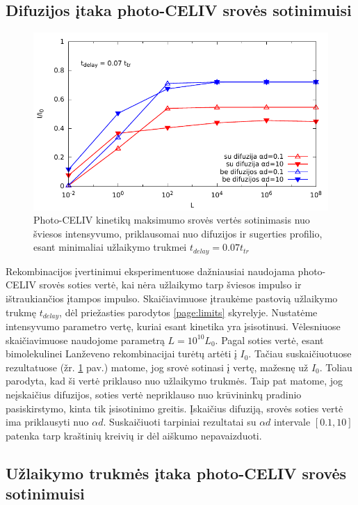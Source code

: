 \subsection{Difuzijos įtaka photo-CELIV srovės sotinimuisi}
\label{page:saturation}
\begin{figure}[H]
  \centering
    \includegraphics{./media/pdf/semilogsaturation.pdf}
  \caption{Photo-CELIV kinetikų maksimumo srovės vertės sotinimasis nuo šviesos intensyvumo, priklausomai nuo difuzijos ir sugerties profilio, esant minimaliai užlaikymo trukmei $t_{delay} = 0.07t_{tr}$}
  \label{fig:saturation}
\end{figure}

Rekombinacijos įvertinimui eksperimentuose dažniausiai naudojama photo-CELIV srovės soties vertė, kai nėra užlaikymo tarp šviesos impulso ir ištraukiančios įtampos impulso. Skaičiavimuose įtraukėme pastovią užlaikymo trukmę $t_{delay}$, dėl priežasties parodytos \ref{page:limits} skyrelyje. Nustatėme intensyvumo parametro vertę, kuriai esant kinetika yra įsisotinusi. Vėlesniuose skaičiavimuose naudojome parametrą $L=10^{10} L_0$. Pagal \cite{juška:155202} soties vertė, esant bimolekulinei Lanževeno rekombinacijai turėtų artėti į $I_0$. Tačiau suskaičiuotuose rezultatuose (žr. \ref{fig:saturation} pav.) matome, jog srovė sotinasi į vertę, mažesnę už $I_0$. Toliau parodyta, kad ši vertė priklauso nuo užlaikymo trukmės.
Taip pat matome, jog neįskaičius difuzijos, soties vertė nepriklauso nuo krūvininkų pradinio pasiskirstymo, kinta tik įsisotinimo greitis.
Įskaičius difuziją, srovės soties vertė ima priklausyti nuo $\alpha d$.
Suskaičiuoti tarpiniai rezultatai su $\alpha d$ intervale $[0.1 , 10]$ patenka tarp kraštinių kreivių ir dėl aiškumo nepavaizduoti.

\subsection{Užlaikymo trukmės įtaka photo-CELIV srovės sotinimuisi}

